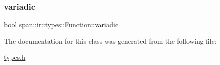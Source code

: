 \mbox{\label{classspan_1_1ir_1_1types_1_1Function_a80c12a5f75fe5c1db469bb0a202987d6}} 
\subsubsection{\texorpdfstring{variadic}{variadic}}
{\footnotesize\ttfamily bool span\+::ir\+::types\+::\+Function\+::variadic\hspace{0.3cm}{\ttfamily [private]}}



The documentation for this class was generated from the following file\+:\begin{DoxyCompactItemize}
\item 
\hyperlink{types_8h}{types.\+h}\end{DoxyCompactItemize}

